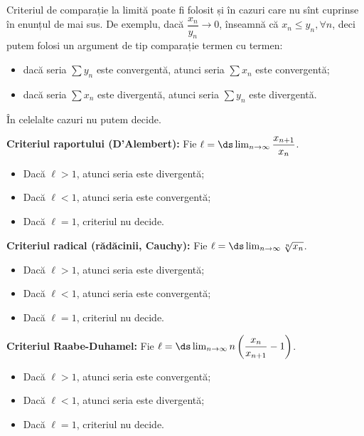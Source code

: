 \begin{remark}\label{rk:comp-alte-cazuri}
    Criteriul de comparație la limită poate fi folosit și în cazuri care nu sînt
    cuprinse în enunțul de mai sus. De exemplu, dacă $ \dfrac{x_n}{y_n} \to 0 $,
    înseamnă că $ x_n \leq y_n, \forall n $, deci putem folosi un argument de tip
    comparație termen cu termen: 
    \begin{itemize}
        \item dacă seria $ \sum y_n $ este convergentă, atunci seria $ \sum x_n $ 
            este convergentă; 
        \item dacă seria $ \sum x_n $ este divergentă, atunci seria $ \sum y_n $ 
            este divergentă.
    \end{itemize}
    În celelalte cazuri nu putem decide.
\end{remark}

\vspace{1cm}

\textbf{Criteriul raportului (D'Alembert):} Fie $ \ell = \ds\lim_{n \to \infty} \dfrac{x_{n+1}}{x_n} $.
\begin{itemize}
    \item Dacă $ \ell > 1 $, atunci seria este divergentă;
    \item Dacă $ \ell < 1 $, atunci seria este convergentă;
    \item Dacă $ \ell = 1 $, criteriul nu decide.
\end{itemize}

\vspace{1cm}

\textbf{Criteriul radical (rădăcinii, Cauchy):} Fie $ \ell = \ds\lim_{n \to \infty} \sqrt[n]{x_n} $.
\begin{itemize}
    \item Dacă $ \ell > 1 $, atunci seria este divergentă;
    \item Dacă $ \ell < 1 $, atunci seria este convergentă;
    \item Dacă $ \ell = 1 $, criteriul nu decide.
\end{itemize}

\vspace{1cm}

\textbf{Criteriul Raabe-Duhamel:} Fie 
$ \ell = \ds\lim_{n \to \infty} n \left( \dfrac{x_n}{x_{n + 1}} - 1 \right) $.
\begin{itemize}
    \item Dacă $ \ell > 1 $, atunci seria este convergentă;
    \item Dacă $ \ell < 1 $, atunci seria este divergentă;
    \item Dacă $ \ell = 1 $, criteriul nu decide.
\end{itemize}

